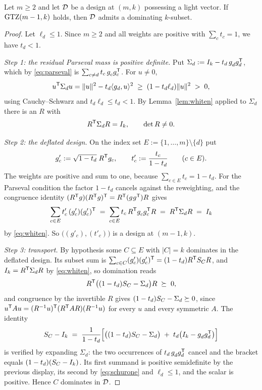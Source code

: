 \begin{theorem}[Lean]\label{thm:light}
Let $m\ge2$ and let $\mathcal{D}$ be a design at $(m,k)$ possessing a light vector.
If $\mathrm{GTZ}(m-1,k)$ holds, then $\mathcal{D}$ admits a dominating $k$-subset.
\end{theorem}

\begin{proof}
Let $\ell_d\le1$.  Since $m\ge2$ and all weights are positive with
$\sum_ct_c=1$, we have $t_d<1$.

\emph{Step 1: the residual Parseval mass is positive definite.}  Put
$\Sigma_d:=I_k-t_d\,g_d^{\vphantom{\mathsf{T}}}g_d\tp$, which by \eqref{eq:parseval} is
$\sum_{c\ne d}t_c\,g_c^{\vphantom{\mathsf{T}}}g_c\tp$.  For $u\ne0$,
\[
  u^{\mathsf{T}} \Sigma_d u=\lVert u\rVert^2-t_d\langle g_d,u\rangle^2
  \;\ge\;(1-t_d\ell_d)\lVert u\rVert^2\;>\;0 ,
\]
using Cauchy--Schwarz and $t_d\ell_d\le t_d<1$.  By Lemma~\ref{lem:whiten}
applied to $\Sigma_d$ there is an $R$ with
\begin{equation}\label{eq:whiten}
  R^{\mathsf{T}} \Sigma_d R=I_k ,\qquad \det R\ne0 .
\end{equation}

\emph{Step 2: the deflated design.}  On the index set
$E:=\{1,\dots,m\}\setminus\{d\}$ put
\[
  g'_c:=\sqrt{1-t_d}\;R^{\mathsf{T}} g_c ,
  \qquad
  t'_c:=\frac{t_c}{1-t_d}
  \qquad (c\in E).
\]
The weights are positive and sum to one, because
$\sum_{c\in E}t_c=1-t_d$.  For the Parseval condition the factor
$1-t_d$ cancels against the reweighting, and the congruence identity
$(R\tp g)(R\tp g)\tp=R\tp(g^{\vphantom{\mathsf{T}}}g\tp)R$ gives
\[
  \sum_{c\in E}t'_c\,(g'_c)(g'_c)\tp
  \;=\;\sum_{c\in E}t_c\,R\tp g_c^{\vphantom{\mathsf{T}}}g_c\tp R
  \;=\;R\tp \Sigma_d R\;=\;I_k
\]
by \eqref{eq:whiten}.  So $\bigl((g'_c),(t'_c)\bigr)$ is a design at
$(m-1,k)$.

\emph{Step 3: transport.}  By hypothesis some $C\subseteq E$ with
$\lvert C\rvert=k$ dominates in the deflated design.  Its subset sum is
$\sum_{c\in C}(g'_c)(g'_c)^{\mathsf{T}}=(1-t_d)R^{\mathsf{T}}S_{C} R$, and $I_k=R^{\mathsf{T}}\Sigma_dR$ by
\eqref{eq:whiten}, so domination reads
\[
  R^{\mathsf{T}}\bigl((1-t_d)S_{C}-\Sigma_d\bigr)R\;\succeq\;0 ,
\]
and congruence by the invertible $R$ gives $(1-t_d)S_{C}-\Sigma_d\succeq0$,
since $u^{\mathsf{T}} Au=(R^{-1}u)^{\mathsf{T}}(R^{\mathsf{T}} AR)(R^{-1}u)$ for every $u$ and every
symmetric $A$.  The identity
\begin{equation}\label{eq:reassemble}
  \SC-I_k
  \;=\;\frac{1}{1-t_d}\Bigl[\bigl((1-t_d)\SC-\Sigma_d\bigr)
        \;+\;t_d\bigl(I_k-g_d^{\vphantom{\mathsf{T}}}g_d\tp\bigr)\Bigr]
\end{equation}
is verified by expanding $\Sigma_d$: the two occurrences of
$t_d\,g_d^{\vphantom{\mathsf{T}}}g_d\tp$ cancel and the bracket equals
$(1-t_d)(S_{C}-I_k)$.  Its first summand is positive semidefinite by the
previous display, its second by \eqref{eq:schurone} and $\ell_d\le1$, and
the scalar is positive.  Hence $C$ dominates in $\mathcal{D}$.
\end{proof}

